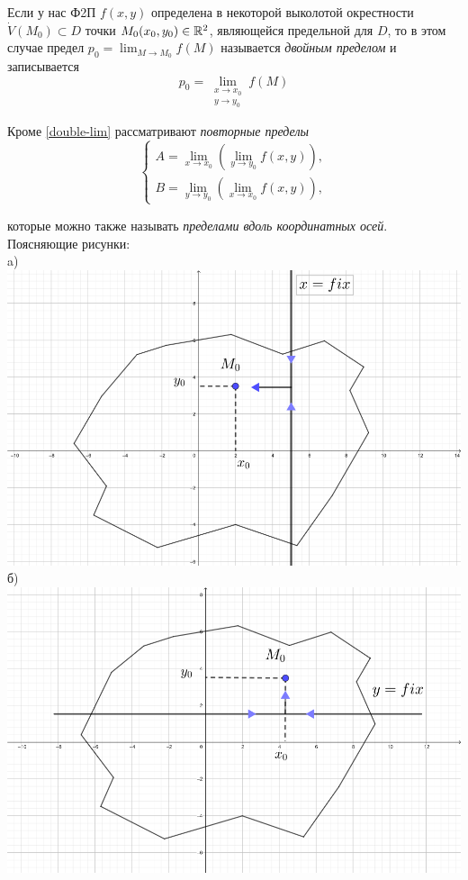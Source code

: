 \documentclass[../../main.tex]{subfiles}
\begin{document}
Если у нас Ф2П $f(x, y)$ определена в некоторой выколотой окрестности 
$\dot{V}(M_0) \subset D$ точки $M_0(x_0, y_0) \in \mathbb{R}^2$,
являющейся предельной для $D$, то в этом случае  предел
$p_0 = \displaystyle \lim_{M \to M_0}{f(M)}$ называется
\emph{двойным пределом} и записывается 
\begin{equation}
\label{double-lim}
p_0 = \underset{\substack{
	x \to x_0 \\
	y \to y_0
}}{\lim}f(M)
\end{equation}

Кроме \eqref{double-lim} рассматривают \emph{повторные пределы}
\begin{equation}
\label{rep-lim}
	\left\{\begin{aligned}
		A = \displaystyle\lim_{x \to x_0}{(\lim_{y \to y_0}{f(x, y)})}, \\
		B = \displaystyle\lim_{y \to y_0}{(\lim_{x \to x_0}{f(x, y)})}, 
	\end{aligned}\right.
\end{equation}

которые можно также называть \emph{пределами вдоль координатных осей}.
Поясняющие рисунки: \\
a) 
\includegraphics[scale=1.0]{rep-lim-case-a.png}
б) 
\includegraphics[scale=1.0]{rep-lim-case-b.png}
\end{document}
